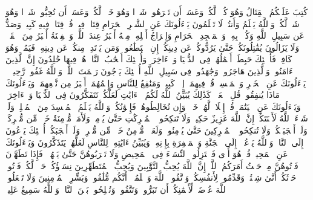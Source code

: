 كُتِبَ عَلَیۡكُمُ ٱلۡقِتَالُ وَهُوَ كُرۡهࣱ لَّكُمۡۖ وَعَسَىٰۤ أَن تَكۡرَهُوا۟ شَیۡءࣰا وَهُوَ خَیۡرࣱ لَّكُمۡۖ وَعَسَىٰۤ أَن تُحِبُّوا۟ شَیۡءࣰا وَهُوَ شَرࣱّ لَّكُمۡۗ وَٱللَّهُ یَعۡلَمُ وَأَنتُمۡ لَا تَعۡلَمُونَ%
\stopbuffer%
\startbuffer[\q:2:217]
یَسۡءَلُونَكَ عَنِ ٱلشَّهۡرِ ٱلۡحَرَامِ قِتَالࣲ فِیهِۖ قُلۡ قِتَالࣱ فِیهِ كَبِیرࣱۚ وَصَدٌّ عَن سَبِیلِ ٱللَّهِ وَكُفۡرُۢ بِهِۦ وَٱلۡمَسۡجِدِ ٱلۡحَرَامِ وَإِخۡرَاجُ أَهۡلِهِۦ مِنۡهُ أَكۡبَرُ عِندَ ٱللَّهِۚ وَٱلۡفِتۡنَةُ أَكۡبَرُ مِنَ ٱلۡقَتۡلِۗ وَلَا یَزَالُونَ یُقَٰتِلُونَكُمۡ حَتَّىٰ یَرُدُّوكُمۡ عَن دِینِكُمۡ إِنِ ٱسۡتَطَٰعُوا۟ۚ وَمَن یَرۡتَدِدۡ مِنكُمۡ عَن دِینِهِۦ فَیَمُتۡ وَهُوَ كَافِرࣱ فَأُو۟لَٰۤئِكَ حَبِطَتۡ أَعۡمَٰلُهُمۡ فِی ٱلدُّنۡیَا وَٱلۡءَاخِرَةِۖ وَأُو۟لَٰۤئِكَ أَصۡحَٰبُ ٱلنَّارِۖ هُمۡ فِیهَا خَٰلِدُونَ%
\stopbuffer%
\startbuffer[\q:2:218]
إِنَّ ٱلَّذِینَ ءَامَنُوا۟ وَٱلَّذِینَ هَاجَرُوا۟ وَجَٰهَدُوا۟ فِی سَبِیلِ ٱللَّهِ أُو۟لَٰۤئِكَ یَرۡجُونَ رَحۡمَتَ ٱللَّهِۚ وَٱللَّهُ غَفُورࣱ رَّحِیمࣱ%
\stopbuffer%
\startbuffer[\q:2:219]
۞ یَسۡءَلُونَكَ عَنِ ٱلۡخَمۡرِ وَٱلۡمَیۡسِرِۖ قُلۡ فِیهِمَاۤ إِثۡمࣱ كَبِیرࣱ وَمَنَٰفِعُ لِلنَّاسِ وَإِثۡمُهُمَاۤ أَكۡبَرُ مِن نَّفۡعِهِمَاۗ وَیَسۡءَلُونَكَ مَاذَا یُنفِقُونَۖ قُلِ ٱلۡعَفۡوَۗ كَذَٰلِكَ یُبَیِّنُ ٱللَّهُ لَكُمُ ٱلۡءَایَٰتِ لَعَلَّكُمۡ تَتَفَكَّرُونَ%
\stopbuffer%
\startbuffer[\q:2:220]
فِی ٱلدُّنۡیَا وَٱلۡءَاخِرَةِۗ وَیَسۡءَلُونَكَ عَنِ ٱلۡیَتَٰمَىٰۖ قُلۡ إِصۡلَاحࣱ لَّهُمۡ خَیۡرࣱۖ وَإِن تُخَالِطُوهُمۡ فَإِخۡوَٰنُكُمۡۚ وَٱللَّهُ یَعۡلَمُ ٱلۡمُفۡسِدَ مِنَ ٱلۡمُصۡلِحِۚ وَلَوۡ شَاۤءَ ٱللَّهُ لَأَعۡنَتَكُمۡۚ إِنَّ ٱللَّهَ عَزِیزٌ حَكِیمࣱ%
\stopbuffer%
\startbuffer[\q:2:221]
وَلَا تَنكِحُوا۟ ٱلۡمُشۡرِكَٰتِ حَتَّىٰ یُؤۡمِنَّۚ وَلَأَمَةࣱ مُّؤۡمِنَةٌ خَیۡرࣱ مِّن مُّشۡرِكَةࣲ وَلَوۡ أَعۡجَبَتۡكُمۡۗ وَلَا تُنكِحُوا۟ ٱلۡمُشۡرِكِینَ حَتَّىٰ یُؤۡمِنُوا۟ۚ وَلَعَبۡدࣱ مُّؤۡمِنٌ خَیۡرࣱ مِّن مُّشۡرِكࣲ وَلَوۡ أَعۡجَبَكُمۡۗ أُو۟لَٰۤئِكَ یَدۡعُونَ إِلَى ٱلنَّارِۖ وَٱللَّهُ یَدۡعُوۤا۟ إِلَى ٱلۡجَنَّةِ وَٱلۡمَغۡفِرَةِ بِإِذۡنِهِۦۖ وَیُبَیِّنُ ءَایَٰتِهِۦ لِلنَّاسِ لَعَلَّهُمۡ یَتَذَكَّرُونَ%
\stopbuffer%
\startbuffer[\q:2:222]
وَیَسۡءَلُونَكَ عَنِ ٱلۡمَحِیضِۖ قُلۡ هُوَ أَذࣰى فَٱعۡتَزِلُوا۟ ٱلنِّسَاۤءَ فِی ٱلۡمَحِیضِ وَلَا تَقۡرَبُوهُنَّ حَتَّىٰ یَطۡهُرۡنَۖ فَإِذَا تَطَهَّرۡنَ فَأۡتُوهُنَّ مِنۡ حَیۡثُ أَمَرَكُمُ ٱللَّهُۚ إِنَّ ٱللَّهَ یُحِبُّ ٱلتَّوَّٰبِینَ وَیُحِبُّ ٱلۡمُتَطَهِّرِینَ%
\stopbuffer%
\startbuffer[\q:2:223]
نِسَاۤؤُكُمۡ حَرۡثࣱ لَّكُمۡ فَأۡتُوا۟ حَرۡثَكُمۡ أَنَّىٰ شِئۡتُمۡۖ وَقَدِّمُوا۟ لِأَنفُسِكُمۡۚ وَٱتَّقُوا۟ ٱللَّهَ وَٱعۡلَمُوۤا۟ أَنَّكُم مُّلَٰقُوهُۗ وَبَشِّرِ ٱلۡمُؤۡمِنِینَ%
\stopbuffer%
\startbuffer[\q:2:224]
وَلَا تَجۡعَلُوا۟ ٱللَّهَ عُرۡضَةࣰ لِّأَیۡمَٰنِكُمۡ أَن تَبَرُّوا۟ وَتَتَّقُوا۟ وَتُصۡلِحُوا۟ بَیۡنَ ٱلنَّاسِۚ وَٱللَّهُ سَمِیعٌ عَلِیمࣱ%
